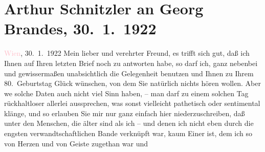 

               \section[Arthur Schnitzler an Georg Brandes, 30. 1. 1922]{ Arthur Schnitzler an Georg Brandes, 30. 1. 1922}\nopagebreak{}\rehead{ }\normalsize\beginnumbering{} \toendnotes[C]{\smallbreak\pagebreak[2]} 
\toendnotes[C]{\smallbreak}\pstart
           \raggedleft{}{\pb}\textcolor{pink}{Wien}{}\ledrightnote{\textcolor{pink}{Wien}}, 30. 1. 1922\pend
           \pstart
           Mein lieber und verehrter Freund, es trifft sich gut, daß ich Ihnen
               auf Ihren letzten Brief noch zu antworten habe, so darf ich, ganz nebenbei und
               gewissermaßen unabsichtlich die Gelegenheit benutzen und Ihnen zu Ihrem
               80. Geburtstag Glück wünschen, von dem Sie natürlich nichts hören wollen. Aber we{\geminationn} solche Daten auch nicht viel Sinn haben, – man darf zu
               einem solchen Tag rückhaltloser  allerlei
               aussprechen, was sonst vielleicht pathetisch oder sentimental klänge, und so erlauben
               Sie mir nur ganz einfach hier niederzuschreiben, daß unter den Menschen, die älter
               sind als ich – und denen ich nicht eben durch die engsten verwandtschaftlichen Bande
               verknüpft war, kaum Einer ist, dem ich so von Herzen und von Geiste zugethan war und
